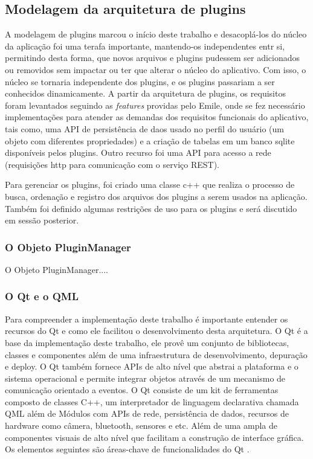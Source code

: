 \subsection{Modelagem da arquitetura de plugins}
A modelagem de plugins marcou o início deste trabalho e desacoplá-los do núcleo da aplicação foi uma terafa importante, mantendo-os independentes entr si, permitindo desta forma, que novos arquivos e plugins pudessem ser adicionados ou removidos sem impactar ou ter que alterar o núcleo do aplicativo. Com isso, o núcleo se tornaria independente dos plugins, e os plugins passariam a ser conhecidos dinamicamente. A partir da arquitetura de plugins, os requisitos foram levantados seguindo as \textit{features} providas pelo Emile, onde se fez necessário implementações para atender as demandas dos requisitos funcionais do aplicativo, tais como, uma API de persistência de daos usado no perfil do usuário (um objeto com diferentes propriedades) e a criação de tabelas em um banco sqlite disponíveis pelos plugins. Outro recurso foi uma API para acesso a rede (requisições http para comunicação com o serviço REST). 

Para gerenciar os plugins, foi criado uma classe c++ que realiza o processo de busca, ordenação e registro dos arquivos dos plugins a serem usados na aplicação. Também foi definido algumas restrições de uso para os plugins e será discutido em sessão posterior.


\subsubsection{O Objeto PluginManager}\label{sec:solucao-desenvolvida}
O Objeto PluginManager....


\subsubsection{O Qt e o QML}\label{sec:solucao-desenvolvida}
Para compreender a implementação deste trabalho é importante entender os recursos do Qt e como ele facilitou o desenvolvimento desta arquitetura. O Qt é a base da implementação deste trabalho, ele provê um conjunto de bibliotecas, classes e componentes além de uma infraestrutura de desenvolvimento, depuração e deploy. O Qt também fornece APIs de alto nível que abstrai a plataforma e o sistema operacional e permite integrar objetos através de um mecanismo de comunicação orientado a eventos. O Qt consiste de um kit de ferramentas composto de classes C++, um interpretador de linguagem declarativa chamada QML além de Módulos com APIs de rede, persistência de dados, recursos de hardware como câmera, bluetooth, sensores e etc. Além de uma ampla de componentes visuais de alto nível que facilitam a construção de interface gráfica. Os elementos seguintes são áreas-chave de funcionalidades do Qt \cite{qt_overviews}.


